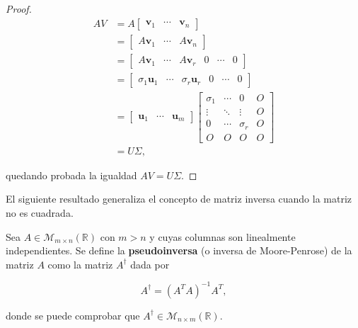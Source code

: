 \begin{proof}
    \begin{align*}
        A V &= A \begin{bmatrix} \mathbf{v}_1 & \cdots & \mathbf{v}_n \end{bmatrix} \\
            &= \begin{bmatrix} A \mathbf{v}_1 & \cdots & A \mathbf{v}_n \end{bmatrix} \\
            &= \begin{bmatrix} A \mathbf{v}_1 & \cdots & A \mathbf{v}_r & 0 & \cdots & 0 \end{bmatrix} \\
            &= \begin{bmatrix} \sigma_1 \mathbf{u}_1 & \cdots & \sigma_r \mathbf{u}_r & 0 & \cdots & 0 \end{bmatrix} \\
            &= \begin{bmatrix} \mathbf{u}_1 & \cdots & \mathbf{u}_m \end{bmatrix}
               \begin{bmatrix} 
                   \sigma_1 & \cdots & 0 & O \\
                   \vdots & \ddots & \vdots & O \\
                   0 & \cdots & \sigma_r & O \\
                   O & O & O & O
               \end{bmatrix} \\
            &= U \Sigma,
    \end{align*}

    quedando probada la igualdad $AV = U \Sigma$.
\end{proof}

El siguiente resultado generaliza el concepto de matriz inversa cuando la matriz no es cuadrada.
\begin{definicion}[Pseudoinversa]
    Sea $A \in \mathcal{M}_{m \times n}(\mathbb{R})$ con $m > n$ y cuyas columnas son linealmente independientes. Se define la \textbf{pseudoinversa} (o inversa de Moore-Penrose) de la matriz $A$ como la matriz $A^{\dagger}$ dada por

    \[ A^{\dagger} = {(A^{T}A)}^{-1}A^{T}, \]

    donde se puede comprobar que $A^{\dagger} \in \mathcal{M}_{n \times m}(\mathbb{R})$.
\end{definicion}

